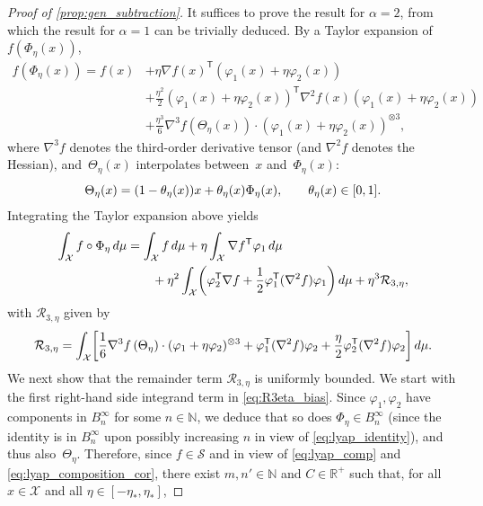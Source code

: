 \documentclass[11pt]{article}
\newcommand{\R}{\mathbb{R}}
\newcommand{\N}{\mathbb{N}}
\renewcommand{\S}{\mathscr{S}}
\renewcommand{\t}{\mathsf T}
\DeclarePairedDelimiter\paren{\lparen}{\rparen}
\DeclarePairedDelimiter\bkt{\lbrack}{\rbrack}
\theoremstyle{definition}
\begin{document}
\begin{proof}[Proof of \cref{prop:gen_subtraction}]
It suffices to prove the result for $\alpha=2$, from which the result for $\alpha=1$ can be trivially deduced. By a Taylor expansion of $f(\Phi_\eta(x))$,
\begin{align*}
		f(\Phi_\eta(x)) = f(x) &+ \eta \nabla f(x)^\t(\varphi_1(x) + \eta\varphi_2(x)) \\
		&+ \frac{\eta^2}{2}(\varphi_1(x) + \eta\varphi_2(x))^\t \nabla^2 f(x)(\varphi_1(x) + \eta\varphi_2(x)) \\
		&+ \frac{\eta^3}{6} \nabla^3f\left(\Theta_\eta(x)\right)\cdot (\varphi_1(x) + \eta\varphi_2(x))^{\otimes 3},
\end{align*}
where $\nabla^3 f$ denotes the third-order derivative tensor (and $\nabla^2 f$ denotes the Hessian), and~$\Theta_\eta(x)$ interpolates between~$x$ and~$\Phi_\eta(x)$:
\begin{equation}
\notag
	\Theta_\eta(x) = (1-\theta_\eta(x))x + \theta_\eta(x)\Phi_\eta(x), \qquad \theta_\eta(x) \in [0,1].
\end{equation}
Integrating the Taylor expansion above yields
\begin{equation}
\label{eq:prop_rhs_terms}
\begin{split}
	\int_\mathcal{X} f\circ\Phi_\eta \, d\mu &= \int_\mathcal{X} f \, d\mu + \eta \int_\mathcal{X}\nabla f^\t \varphi_1 \, d\mu \\
 &\qquad + \eta^2\int_\mathcal{X} \paren*{\varphi_2^\t \nabla f+\frac{1}{2}\varphi_1^\t(\nabla^2 f)\varphi_1} \, d\mu + \eta^3\mathcal{R}_{3,\eta},
 \end{split}
\end{equation}
with $\mathcal{R}_{3,\eta}$ given by 
\begin{equation}
\mathcal{R}_{3,\eta} = \int_\mathcal{X} \bkt*{\frac{1}{6}\nabla^3f\left(\Theta_\eta\right)\cdot (\varphi_1 + \eta\varphi_2)^{\otimes 3} + \varphi_1^\t (\nabla^2 f)\varphi_2 + \frac{\eta}{2}\varphi_2^\t (\nabla^2 f)\varphi_2} \, d\mu.
	\label{eq:R3eta_bias}
\end{equation}
We next show that the remainder term $\mathcal{R}_{3,\eta}$ is uniformly bounded. We start with the first right-hand side integrand term in \eqref{eq:R3eta_bias}. Since $\varphi_1,\varphi_2$ have components in $B^\infty_n$ for some $n\in\N$, we deduce that so does $\Phi_\eta\in B^\infty_n$ (since the identity is in $B^\infty_n$ upon possibly increasing $n$ in view of \eqref{eq:lyap_identity}), and thus also~$\Theta_\eta$. Therefore, since $f\in\S$ and in view of \eqref{eq:lyap_comp} and \eqref{eq:lyap_composition_cor}, there exist $m,n'\in\N$ and $C\in\R^+$ such that, for all~$x\in\mathcal{X}$ and all $\eta\in [-\eta_*,\eta_*]$,

\end{proof}
\end{document}

